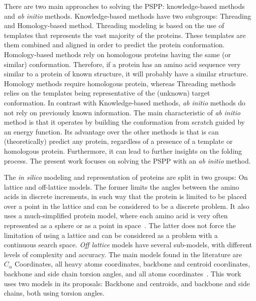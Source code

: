 There are two main approaches to solving the \ac{PSPP}: knowledge-based methods
and \textit{ab initio} methods. Knowledge-based methods have two subgroups:
Threading and Homology-based method. Threading modeling is based on the use of
templates that represents the vast majority of the proteins. These templates
are them combined and aligned in order to predict the protein conformation.
Homology-based methods rely on homologous proteins having the same (or similar)
conformation. Therefore, if a protein has an amino acid sequence very similar
to a protein of known structure, it will probably have a similar structure.
Homology methods require homologous protein, whereas Threading methods relies
on the templates being representative of the (unknown) target conformation. In
contrast with Knowledge-based methods, \textit{ab initio} methods do not rely
on previously known information. The main characteristic of \textit{ab initio}
method is that it operates by building the conformation from scratch guided by
an energy function. Its advantage over the other
methods is that is can (theoretically) predict any protein, regardless of a
presence of a template or homologous protein. Furthermore, it can lead to
further insights on the folding process. The present work focuses on solving the \ac{PSPP} with an \textit{ab initio} method.

The \textit{in silico} modeling and representation of proteins are split in two
groups: On lattice and off-lattice models. The former limits the angles between
the amino acids in discrete increments, in such way that the protein is limited
to be placed over a point in the lattice and can be considered to be a discrete
problem. It also uses a much-simplified protein model, where each amino acid is
very often represented as a sphere or as a point in space~\cite{berger1998protein}.
The latter does not force the limitation of using a
lattice and can be considered as a problem with
a continuous search space. \textit{Off lattice} models have several
sub-models, with different levels of complexity and accuracy. The main models
found in the literature are $C_\alpha$ Coordinates, all heavy atoms
coordinates, backbone and centroid coordinates, backbone and side chain torsion
angles, and all atoms coordinates~\cite{dorn2014three,rohl2004protein}.
This work uses two models in its proposals: Backbone and centroids, and backbone and side chains, both using torsion angles.

